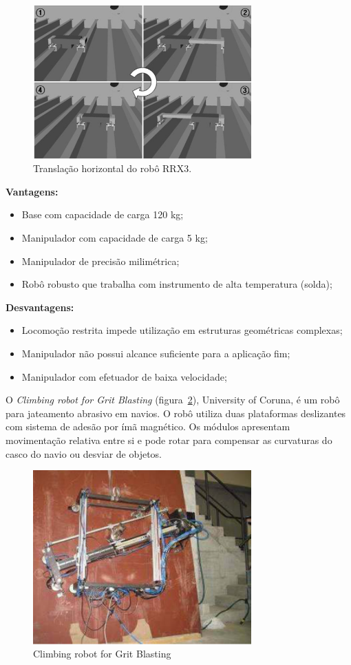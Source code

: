 \begin{figure}[ht]
\centering
\includegraphics[width=8.4cm]{figs/climbers/RRX3_moving.jpg}
\caption{Translação horizontal do robô RRX3.}
\label{rrx3}
\end{figure}

\textbf{Vantagens:}
\begin{itemize}
  \item Base com capacidade de carga 120 kg;
  \item Manipulador com capacidade de carga 5 kg;
  \item Manipulador de precisão milimétrica;
  \item Robô robusto que trabalha com instrumento de alta temperatura (solda);
\end{itemize}

\textbf{Desvantagens:}
\begin{itemize}
  \item Locomoção restrita impede utilização em estruturas geométricas
  complexas;
  \item Manipulador não possui alcance suficiente para a aplicação fim;
  \item Manipulador com efetuador de baixa velocidade;
\end{itemize}

O \emph{Climbing robot for Grit Blasting} (figura~\ref{grit}), University of
Coruna, é um robô para jateamento abrasivo em navios. O robô utiliza duas plataformas deslizantes com sistema de adesão por
ímã magnético. Os módulos apresentam movimentação relativa entre si e pode rotar
para compensar as curvaturas do casco do navio ou desviar de objetos. 

\begin{figure}[ht]
\centering
\includegraphics[width=8.4cm]{figs/climbers/grit.png}
\caption{Climbing robot for Grit Blasting}
\label{grit}
\end{figure}

